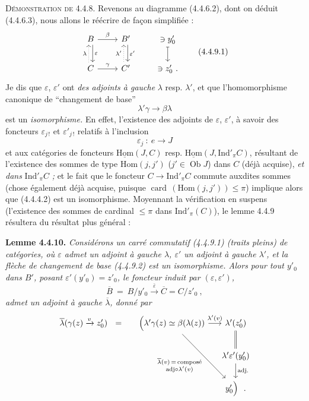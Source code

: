 \documentclass[11pt]{article}
\newcommand{\printedpage}[1]{\marginpar{\footnotesize p.~#1}}
\newcommand{\msp}[1]{\marginpar{\footnotesize [#1]}}
\newcommand{\uHom}{\underline{\mathrm{Hom}}}
\newcommand{\Hom}{\mathrm{Hom}}
\newcommand{\Ind}{\mathrm{Ind}}
\newcommand{\Ob}{\operatorname{Ob}}
\newcommand{\card}{\operatorname{card}}
\begin{document}
\msp{page 90}
\textsc{Démonstration de} 4.4.8. Revenons au diagramme (4.4.6.2), dont on déduit (4.4.6.3), nous allons le réécrire de façon simplifiée :
\[
\begin{tikzcd}
B \arrow[r, "\beta"] \arrow[d, shift left, "\varepsilon"] & B' \arrow[d, shift left, "\varepsilon'"] & \ni y'_0 \arrow[d, mapsto] \\
C \arrow[r, "\gamma"] \arrow[u, dotted, shift left, "\lambda"] & C' \arrow[u, dotted, shift left, "\lambda'"] & \ni z'_0\ .
\end{tikzcd}
\tag*{(4.4.9.1)}
\]
Je dis que $\varepsilon$, $\varepsilon'$ ont \textit{des adjoints à gauche} $\lambda$ resp. $\lambda'$, et que l'homomorphisme canonique de “changement de base”
\[
\lambda'\gamma \longrightarrow \beta\lambda \tag*{(4.4.9.2)}
\]
est un \textit{isomorphisme.} En effet, l'existence des adjoints de $\varepsilon$, $\varepsilon'$, à savoir des foncteurs $\varepsilon_{j\,!}$ et $\varepsilon'_{j\,!}$ relatifs à l'inclusion
\[
\varepsilon_j \ :\ e \longrightarrow J
\]
et aux catégories de foncteurs $\uHom(J,C)$ resp. $\uHom(J,\Ind'_\pi C)$, résultant de l'existence des sommes de type $\Hom(j,j')$ ($j' \in \Ob J$) dans $C$ (déjà acquise), \textit{et dans} $\Ind'_\pi C$\textit{ ;} et le fait que le foncteur $C \longrightarrow \Ind'_\pi C$ commute
\msp{page 91}
auxdites sommes (chose également déjà acquise, puisque $\card\, (\Hom(j,j')) \leqslant \pi$) implique alors que (4.4.4.2) est un isomorphisme. Moyennant la vérification en suspens (l'existence %
\printedpage{22}
des sommes de cardinal $\leqslant \pi$ dans $\Ind'_\pi(C)$), le lemme 4.4.9 résultera du résultat plus général :

\textbf{Lemme 4.4.10.} \textit{Considérons un carré commutatif (4.4.9.1) (traits pleins) de catégories, où $\varepsilon$ admet un adjoint à gauche $\lambda$, $\varepsilon'$ un adjoint à gauche $\lambda'$, et la flèche de changement de base (4.4.9.2) est un isomorphisme. Alors pour tout $y'_0$ dans $B'$, posant $\varepsilon'(y'_0) = z'_0$, le foncteur induit par $(\varepsilon, \varepsilon')$,}
\[
\overline{B} \ =\ B/y'_0 \xrightarrow{\bar{\varepsilon}} \overline{C} = C/z'_0\ ,
\]
\textit{admet un adjoint à gauche $\overline{\lambda}$, donné par}
\[
\begin{tikzcd}[column sep=small]
\overline{\lambda}(\gamma(z) \xrightarrow{v} z'_0) \ \ = & \Bigl(\lambda'\gamma(z) \simeq \beta(\lambda(z)) \arrow[r, "{\lambda'(v)}"] \arrow[ddr, "{\substack{\overline{\lambda}(v) \,=\, \text{composé}\\ \text{adj} \circ \lambda'(v)}}"'] & \lambda'(z'_0) \arrow[d, equal] \\
 & & \lambda'\varepsilon'(y'_0) \arrow[d, "\text{adj.}"] \\
 & & y'_0\Bigr)\ \ .
\end{tikzcd}
\]
\end{document}
